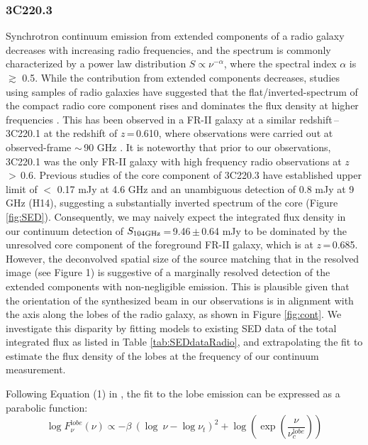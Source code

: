 \documentclass[twocolumn,apj,numberedappendix]{emulateapj}
\begin{document}
\subsubsection{3C220.3}\label{sec:SEDFg}
Synchrotron continuum emission from extended components of a radio galaxy decreases with increasing radio frequencies, 
and the spectrum is commonly characterized by a power law distribution $S \propto \nu^{-\alpha}$, where the 
spectral index $\alpha$ is $\gtrsim$ 0.5. While the contribution from extended components decreases, studies using 
samples of radio galaxies have suggested that the flat/inverted-spectrum of the compact radio core component rises 
and dominates the flux density at higher frequencies \citep{Kellermann81a,Begelman84a}. This has been observed in a FR-II galaxy at a similar redshift\,--\,3C220.1 at the redshift of $z$\,=\,0.610, where observations were carried out at observed-frame $\sim$\,90 GHz \citep{Hardcastle08a}. It is noteworthy that prior to our observations, 3C220.1 was the only FR-II galaxy with high frequency radio observations at $z$\,$>$\,0.6. Previous studies of the core component of 3C220.3 have established upper 
limit of $<$ 0.17 mJy at 4.6 GHz \citep{Mullin06a} and an unambiguous detection of 0.8 mJy at 9 GHz (H14), suggesting a substantially inverted spectrum of the core (Figure \ref{fig:SED}).
Consequently, we may naively expect the integrated flux density in our continuum detection of $S_{\rm 104GHz}$\,=\,9.46\,$\pm$\,0.64\,\,mJy to be dominated by the unresolved core component of the foreground FR-II galaxy, which is at $z$\,=\,0.685. 
However, the deconvolved spatial size of the source matching that in the resolved image (see Figure 1) is 
suggestive of a marginally resolved detection of the extended components with non-negligible emission. 
This is plausible given that the orientation of the synthesized beam in our observations is in alignment with the 
axis along the 
lobes of the radio galaxy, as shown in Figure \ref{fig:cont}. We investigate this disparity by fitting models to 
existing SED data of the total integrated flux as listed in Table \ref{tab:SEDdataRadio}, and extrapolating the fit to 
estimate the flux density of the lobes at the frequency of our continuum measurement. 

Following Equation (1) in \citet{Cleary07a}, the fit to the lobe emission can be expressed as a parabolic function:
\begin{equation}
\log F_{\nu}^{\mathrm lobe} (\nu) \propto - \beta\ (\log\ \nu - \log \nu_{t})^2  + \log (\exp({\frac{\nu}{\nu_c^{\mathrm lobe}}}))
\end{equation}
\end{document}
